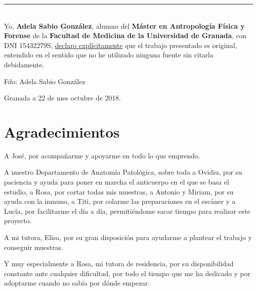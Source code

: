 \noindent\rule[-1ex]{\textwidth}{2pt}\\[4.5ex]

Yo, \textbf{Adela Sabio González}, alumno del \textbf{Máster en Antropología Física y Forense} de la \textbf{Facultad de Medicina de la Universidad de Granada}, con DNI 15432279S, \underline{declaro explícitamente} que el trabajo presentado es original, entendido en el sentido que no he utilizado ninguna fuente sin citarla debidamente.

\vspace{6cm}

\noindent Fdo: Adela Sabio González

\vspace{2cm}

\begin{flushright}
Granada a 22 de mes octubre de 2018.
\end{flushright}


\chapter*{Agradecimientos}
\thispagestyle{empty}

       \vspace{1cm}


A José, por acompañarme y apoyarme en todo lo que emprendo.

A nuestro Departamento de Anatomía Patológica, sobre todo a Ovidiu, por su paciencia y ayuda para poner en marcha el anticuerpo en el que se basa el estudio, a Rosa, por cortar todas mis muestras, a Antonio y Miriam, por su ayuda con la inmuno, a Titi, por colarme las preparaciones en el escáner y a Lucía, por facilitarme el día a día, permitiéndome sacar tiempo para realizar este proyecto.

A mi tutora, Elisa, por su gran disposición para ayudarme a plantear el trabajo y conseguir muestras. 

Y muy especialmente a Rosa, mi tutora de residencia, por su disponibilidad constante ante cualquier dificultad, por todo el tiempo que me ha dedicado y por adoptarme cuando no sabía por dónde empezar. 


